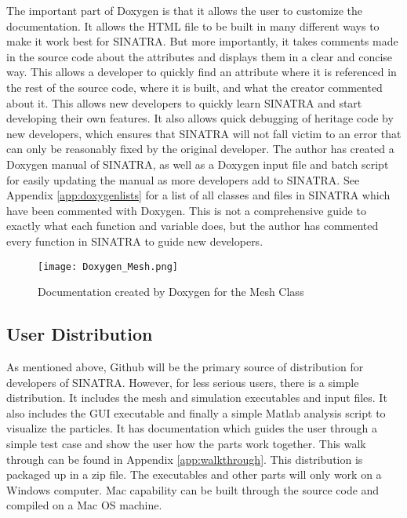 
\indent The important part of Doxygen is that it allows the user to customize the documentation. It allows the HTML file to be built in many different ways to make it work best for SINATRA. But more importantly, it takes comments made in the source code about the attributes and displays them in a clear and concise way. This allows a developer to quickly find an attribute where it is referenced in the rest of the source code, where it is built, and what the creator commented about it. This allows new developers to quickly learn SINATRA and start developing their own features. It also allows quick debugging of heritage code by new developers, which ensures that SINATRA will not fall victim to an error that can only be reasonably fixed by the original developer. The author has created a Doxygen manual of SINATRA, as well as a Doxygen input file and batch script for easily updating the manual as more developers add to SINATRA. See Appendix \ref{app:doxygenlists} for a list of all classes and files in SINATRA which have been commented with Doxygen. This is not a comprehensive guide to exactly what each function and variable does, but the author has commented every function in SINATRA to guide new developers.


\begin{figure}
\texttt{[image: Doxygen\_Mesh.png]}
\centering
\caption{Documentation created by Doxygen for the Mesh Class}
\label{fig:Doxygen_Mesh}
\end{figure}


\subsection{User Distribution}

As mentioned above, Github will be the primary source of distribution for developers of SINATRA. However, for less serious users, there is a simple distribution. It includes the mesh and simulation executables and input files. It also includes the GUI executable and finally a simple Matlab analysis script to visualize the particles. It has documentation which guides the user through a simple test case and show the user how the parts work together. This walk through can be found in Appendix \ref{app:walkthrough}. This distribution is packaged up in a zip file. The executables and other parts will only work on a Windows computer. Mac capability can be built through the source code and compiled on a Mac OS machine. \par

